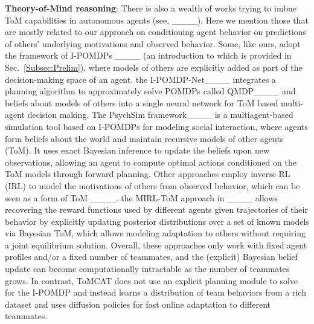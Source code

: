 \textbf{Theory-of-Mind reasoning}: There is also a wealth of works trying to imbue ToM capabilities in autonomous agents (see, \eg ____). Here we mention those that are mostly related to our approach on conditioning agent behavior on predictions of others' underlying motivations and observed behavior. Some, like ours, adopt the framework of I-POMDPs ____ (an introduction to which is provided in Sec.~\ref{Subsec:Prelim}), where models of others are explicitly added as part of the decision-making space of an agent. \Eg the I-POMDP-Net____ integrates a planning algorithm to approximately solve POMDPs called QMDP____ and beliefs about models of others into a single neural network for ToM based multi-agent decision making. The PsychSim framework____ is a multiagent-based simulation tool based on I-POMDPs for modeling social interaction, where agents form beliefs about the world and maintain recursive models of other agents (ToM). It uses exact Bayesian inference to update the beliefs upon new observations, allowing an agent to compute optimal actions conditioned on the ToM models through forward planning. 
%
Other approaches employ inverse RL (IRL) to model the motivations of others from observed behavior, which can be seen as a form of ToM ____. \Eg the MIRL-ToM approach in ____ allows recovering the reward functions used by different agents given trajectories of their behavior by explicitly updating posterior distributions over a set of known models via Bayesian ToM, which allows modeling adaptation to others without requiring a joint equilibrium solution. Overall, these approaches only work with fixed agent profiles and/or a fixed number of teammates, and the (explicit) Bayesian belief update can become computationally intractable as the number of teammates grows. In contrast, ToMCAT does not use an explicit planning module to solve for the I-POMDP and instead learns a distribution of team behaviors from a rich dataset and uses diffusion policies for fast online adaptation to different teammates.

